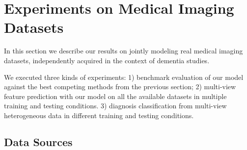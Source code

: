 \section{Experiments on Medical Imaging Datasets}
\label{sec:real}

% 
% 
% 

% 
In this section we describe our results on jointly modeling real medical imaging datasets, independently acquired in the context of dementia studies.

We executed three kinds of experiments:
1) benchmark evaluation of our model against the best competing methods from the previous section;
2) multi-view feature prediction with our model on all the available datasets in multiple training and testing conditions.
3) diagnosis classification from multi-view heterogeneous data in different training and testing conditions.

\subsection{Data Sources}
\label{ssec:datasets}

